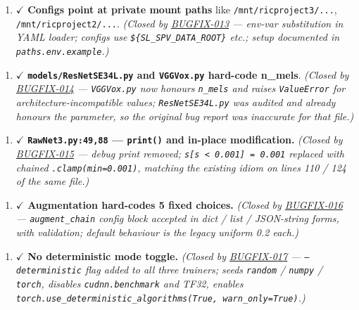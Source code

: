 \documentclass[10pt,a4paper]{article}
\begin{document}
\begin{enumerate}[leftmargin=*,itemsep=2pt]
  \item {\color{green!50!black}$\checkmark$} \textbf{Configs point at private mount paths} like \texttt{/mnt/ricproject3/...}, \texttt{/mnt/ricproject2/...}. \textit{(Closed by \href{docs/bugfixes/BUGFIX-013-portable-config-paths.md}{BUGFIX-013} --- env-var substitution in YAML loader; configs use \texttt{\$\{SL\_SPV\_DATA\_ROOT\}} etc.; setup documented in \texttt{paths.env.example}.)}
\end{enumerate}

\begin{enumerate}[leftmargin=*,itemsep=2pt]
  \item {\color{green!50!black}$\checkmark$} \textbf{\texttt{models/ResNetSE34L.py} and \texttt{VGGVox.py} hard-code n\_mels}. \textit{(Closed by \href{docs/bugfixes/BUGFIX-014-honour-n-mels-in-vggvox.md}{BUGFIX-014} --- \texttt{VGGVox.py} now honours \texttt{n\_mels} and raises \texttt{ValueError} for architecture-incompatible values; \texttt{ResNetSE34L.py} was audited and already honours the parameter, so the original bug report was inaccurate for that file.)}
\end{enumerate}

\begin{enumerate}[leftmargin=*,itemsep=2pt]
  \item {\color{green!50!black}$\checkmark$} \textbf{\texttt{RawNet3.py:49,88} --- \texttt{print()} and in-place modification.} \textit{(Closed by \href{docs/bugfixes/BUGFIX-015-rawnet3-debug-print-and-inplace.md}{BUGFIX-015} --- debug print removed; \texttt{s[s < 0.001] = 0.001} replaced with chained \texttt{.clamp(min=0.001)}, matching the existing idiom on lines 110 / 124 of the same file.)}
\end{enumerate}

\begin{enumerate}[leftmargin=*,itemsep=2pt]
  \item {\color{green!50!black}$\checkmark$} \textbf{Augmentation hard-codes 5 fixed choices.} \textit{(Closed by \href{docs/bugfixes/BUGFIX-016-configurable-augment-chain.md}{BUGFIX-016} --- \texttt{augment\_chain} config block accepted in dict / list / JSON-string forms, with validation; default behaviour is the legacy uniform 0.2 each.)}
\end{enumerate}

\begin{enumerate}[leftmargin=*,itemsep=2pt]
  \item {\color{green!50!black}$\checkmark$} \textbf{No deterministic mode toggle.} \textit{(Closed by \href{docs/bugfixes/BUGFIX-017-deterministic-mode-toggle.md}{BUGFIX-017} --- \texttt{--deterministic} flag added to all three trainers; seeds \texttt{random} / \texttt{numpy} / \texttt{torch}, disables \texttt{cudnn.benchmark} and TF32, enables \texttt{torch.use\_deterministic\_algorithms(True, warn\_only=True)}.)}
\end{enumerate}
\end{document}
